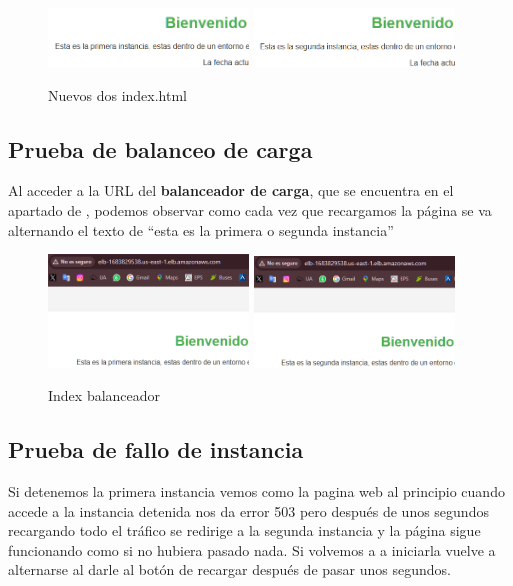 \documentclass{article}
\begin{document}
	\begin{figure}[H]
	\centering
	\includegraphics[width=0.475\textwidth]{PrimeraInstancia.png}
	\includegraphics[width=0.475\textwidth]{SegundaInstancia.png}
	\caption{Nuevos dos index.html}
	\end{figure}
	 


\subsection{Prueba de balanceo de carga}
	Al acceder a la URL del \textbf{balanceador de carga}, que se encuentra en el apartado de , podemos observar como cada vez que recargamos la página se va alternando el texto de ``esta es la primera o segunda instancia''
	\begin{figure}[H]
	\centering
	\includegraphics[width=0.475\textwidth]{index_balanceo_1.png}
	\includegraphics[width=0.475\textwidth]{index_balanceo_2.png}
	\caption{Index balanceador}
	\end{figure}

\subsection{Prueba de fallo de instancia}
	Si detenemos la primera instancia vemos como la pagina web al principio cuando accede a la instancia detenida nos da error 503 pero después de unos segundos recargando todo el tráfico se redirige a la segunda instancia y la página sigue funcionando como si no hubiera pasado nada. Si volvemos a a iniciarla vuelve a alternarse al darle al botón de recargar después de pasar unos segundos.
\end{document}
